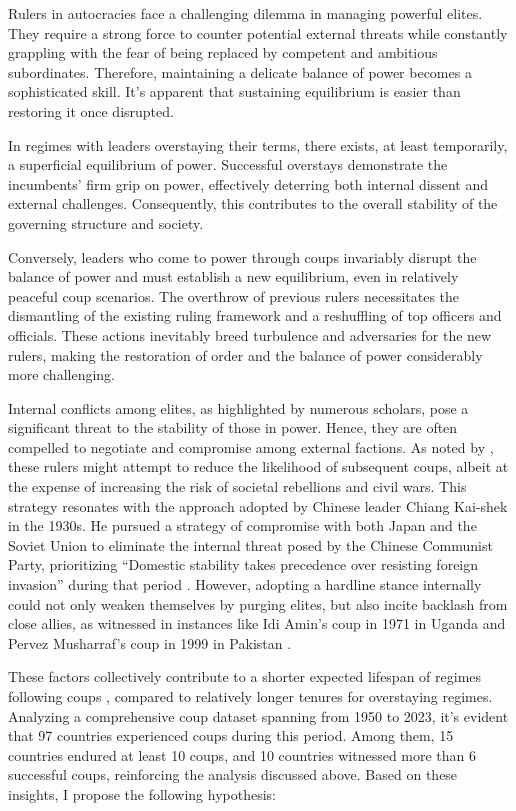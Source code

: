 \documentclass[
  12pt,
  a4paper,
  12pt]{article}
\begin{document}
Rulers in autocracies face a challenging dilemma in managing powerful
elites. They require a strong force to counter potential external
threats while constantly grappling with the fear of being replaced by
competent and ambitious subordinates. Therefore, maintaining a delicate
balance of power becomes a sophisticated skill. It's apparent that
sustaining equilibrium is easier than restoring it once disrupted.

In regimes with leaders overstaying their terms, there exists, at least
temporarily, a superficial equilibrium of power. Successful overstays
demonstrate the incumbents' firm grip on power, effectively deterring
both internal dissent and external challenges. Consequently, this
contributes to the overall stability of the governing structure and
society.

Conversely, leaders who come to power through coups invariably disrupt
the balance of power and must establish a new equilibrium, even in
relatively peaceful coup scenarios. The overthrow of previous rulers
necessitates the dismantling of the existing ruling framework and a
reshuffling of top officers and officials. These actions inevitably
breed turbulence and adversaries for the new rulers, making the
restoration of order and the balance of power considerably more
challenging.

Internal conflicts among elites, as highlighted by numerous scholars,
pose a significant threat to the stability of those in power. Hence,
they are often compelled to negotiate and compromise among external
factions. As noted by \citet{roessler2011}, these rulers might attempt
to reduce the likelihood of subsequent coups, albeit at the expense of
increasing the risk of societal rebellions and civil wars. This strategy
resonates with the approach adopted by Chinese leader Chiang Kai-shek in
the 1930s. He pursued a strategy of compromise with both Japan and the
Soviet Union to eliminate the internal threat posed by the Chinese
Communist Party, prioritizing ``Domestic stability takes precedence over
resisting foreign invasion'' during that period \citep{chu1999chiang}.
However, adopting a hardline stance internally could not only weaken
themselves by purging elites, but also incite backlash from close
allies, as witnessed in instances like Idi Amin's coup in 1971 in Uganda
and Pervez Musharraf's coup in 1999 in Pakistan \citep{sudduth2017a}.

These factors collectively contribute to a shorter expected lifespan of
regimes following coups \citep{dahl2023}, compared to relatively longer
tenures for overstaying regimes. Analyzing a comprehensive coup dataset
\citep{powell2011} spanning from 1950 to 2023, it's evident that 97
countries experienced coups during this period. Among them, 15 countries
endured at least 10 coups, and 10 countries witnessed more than 6
successful coups, reinforcing the analysis discussed above. Based on
these insights, I propose the following hypothesis:
\end{document}
